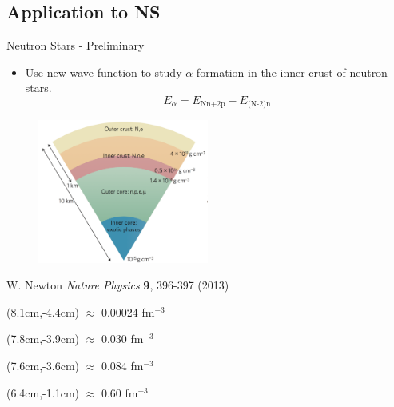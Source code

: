 \documentclass{beamer}
\begin{document}
\subsection{Application to NS}
\begin{frame}{Neutron Stars - Preliminary}
\begin{itemize}
   \item Use new wave function to study $\alpha$ formation in the inner crust of neutron stars.
   \begin{equation*}
      E_\alpha = E_\text{Nn+2p} - E_\text{(N-2)n}
   \end{equation*}
\end{itemize}
\vspace{-0.5cm}
\begin{figure}[h]
   \centering
   \includegraphics[width=0.5\textwidth]{neutronstar.png}
\end{figure}
W. Newton {\it Nature Physics} {\bf 9}, 396-397 (2013)
\begin{textblock*}{\textwidth}(8.1cm,-4.4cm) %
   \tiny $\approx$ 0.00024 fm$^{-3}$
\end{textblock*}
\begin{textblock*}{\textwidth}(7.8cm,-3.9cm) %
   \tiny $\approx$ 0.030 fm$^{-3}$
\end{textblock*}
\begin{textblock*}{\textwidth}(7.6cm,-3.6cm) %
   \tiny $\approx$ 0.084 fm$^{-3}$
\end{textblock*}
\begin{textblock*}{\textwidth}(6.4cm,-1.1cm) %
   \tiny $\approx$ 0.60 fm$^{-3}$
\end{textblock*}
\end{frame}
\end{document}
